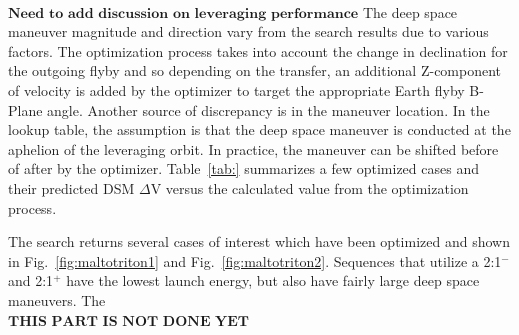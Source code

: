 \documentclass[letterpaper, paper,11pt]{./AAS}		%
\begin{document}
%
%
\\$\textbf{Need to add discussion on leveraging performance}$
The deep space maneuver magnitude and direction vary from the search results due to various factors. The optimization process takes into account the change in declination for the outgoing flyby and so depending on the transfer, an additional Z-component of velocity is added by the optimizer to target the appropriate Earth flyby B-Plane angle. Another source of discrepancy is in the maneuver location. In the lookup table, the assumption is that the deep space maneuver is conducted at the aphelion of the leveraging orbit. In practice, the maneuver can be shifted before of after by the optimizer. Table~\ref{tab:} summarizes a few optimized cases and their predicted DSM $\Delta$V versus the calculated value from the optimization process.


The search returns several cases of interest which have been optimized and shown in Fig.~\ref{fig:maltotriton1} and Fig.~\ref{fig:maltotriton2}. Sequences that utilize a 2:1$^{-}$ and 2:1$^{+}$ have the lowest launch energy, but also have fairly large deep space maneuvers. The
\\$\textbf{THIS PART IS NOT DONE YET}$
\end{document}
